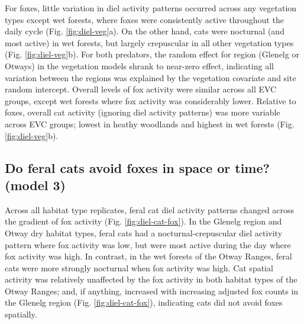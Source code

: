 \documentclass[11pt,a4paper,titlepage,twoside,openright]{style/unimelbthesis}
\begin{document}
\begin{mainmatter}
For foxes, little variation in diel activity patterns occurred across any vegetation types except wet forests, where foxes were consistently active throughout the daily cycle (Fig. \ref{fig:diel-veg}a). On the other hand, cats were nocturnal (and most active) in wet forests, but largely crepuscular in all other vegetation types (Fig. \ref{fig:diel-veg}b). For both predators, the random effect for region (Glenelg or Otways) in the vegetation models shrank to near-zero effect, indicating all variation between the regions was explained by the vegetation covariate and site random intercept. Overall levels of fox activity were similar across all EVC groups, except wet forests where fox activity was considerably lower. Relative to foxes, overall cat activity (ignoring diel activity patterns) was more variable across EVC groups; lowest in heathy woodlands and highest in wet forests (Fig. \ref{fig:diel-veg}b).

\hypertarget{do-feral-cats-avoid-foxes-in-space-or-time-model-3-1}{%
\subsection{Do feral cats avoid foxes in space or time? (model 3)}\label{do-feral-cats-avoid-foxes-in-space-or-time-model-3-1}}

Across all habitat type replicates, feral cat diel activity patterns changed across the gradient of fox activity (Fig. \ref{fig:diel-cat-fox}). In the Glenelg region and Otway dry habitat types, feral cats had a nocturnal-crepuscular diel activity pattern where fox activity was low, but were most active during the day where fox activity was high. In contrast, in the wet forests of the Otway Ranges, feral cats were more strongly nocturnal when fox activity was high. Cat spatial activity was relatively unaffected by the fox activity in both habitat types of the Otway Ranges; and, if anything, increased with increasing adjusted fox counts in the Glenelg region (Fig. \ref{fig:diel-cat-fox}), indicating cats did not avoid foxes spatially.

\newpage
\begin{figure}


\end{figure}
\end{mainmatter}
\end{document}
